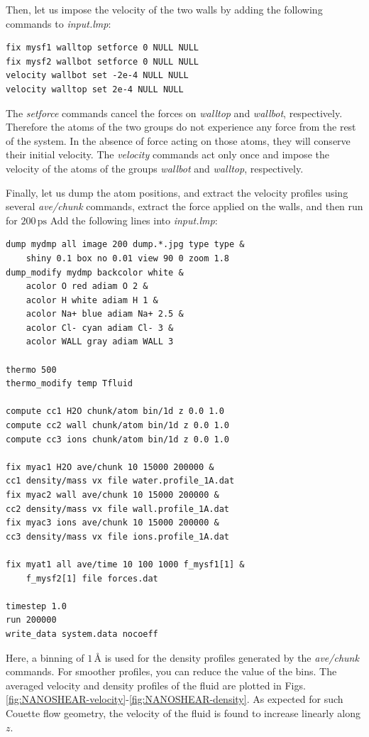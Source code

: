 \documentclass[9pt,tutorial]{livecoms}
\begin{document}
Then, let us impose the velocity of the two walls by adding the following
commands to \textit{input.lmp}:
{\normalsize \begin{verbatim}
fix mysf1 walltop setforce 0 NULL NULL
fix mysf2 wallbot setforce 0 NULL NULL
velocity wallbot set -2e-4 NULL NULL
velocity walltop set 2e-4 NULL NULL
\end{verbatim}}
The \textit{setforce} commands cancel the forces on \textit{walltop} and
\textit{wallbot}, respectively. Therefore the atoms of the two groups do not
experience any force from the rest of the system. In the absence of force acting
on those atoms, they will conserve their initial velocity. The \textit{velocity}
commands act only once and impose the velocity of the atoms of the groups
\textit{wallbot} and \textit{walltop}, respectively.

Finally, let us dump the atom positions, and extract the velocity profiles using
several \textit{ave/chunk} commands, extract the force applied on the walls, and
then run for $200\,\text{ps}$ Add the following lines into \textit{input.lmp}:
{\normalsize \begin{verbatim}
dump mydmp all image 200 dump.*.jpg type type &
    shiny 0.1 box no 0.01 view 90 0 zoom 1.8
dump_modify mydmp backcolor white &
    acolor O red adiam O 2 &
    acolor H white adiam H 1 &
    acolor Na+ blue adiam Na+ 2.5 &
    acolor Cl- cyan adiam Cl- 3 &
    acolor WALL gray adiam WALL 3

thermo 500
thermo_modify temp Tfluid

compute cc1 H2O chunk/atom bin/1d z 0.0 1.0
compute cc2 wall chunk/atom bin/1d z 0.0 1.0
compute cc3 ions chunk/atom bin/1d z 0.0 1.0

fix myac1 H2O ave/chunk 10 15000 200000 &
cc1 density/mass vx file water.profile_1A.dat
fix myac2 wall ave/chunk 10 15000 200000 &
cc2 density/mass vx file wall.profile_1A.dat
fix myac3 ions ave/chunk 10 15000 200000 &
cc3 density/mass vx file ions.profile_1A.dat

fix myat1 all ave/time 10 100 1000 f_mysf1[1] &
    f_mysf2[1] file forces.dat

timestep 1.0
run 200000
write_data system.data nocoeff
\end{verbatim}}
Here, a binning of $1\,\text{\AA{}}$ is used for the density profiles generated
by the \textit{ave/chunk} commands. For smoother profiles, you can reduce the value
of the bins. The averaged velocity and density profiles of the fluid are plotted
in Figs.\ref{fig:NANOSHEAR-velocity}-\ref{fig:NANOSHEAR-density}. As expected for
such Couette flow geometry, the velocity of the fluid is found to increase linearly
along $z$.
\end{document}
